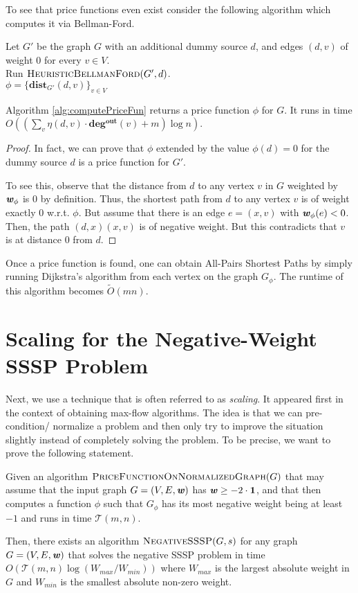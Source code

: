 To see that price functions even exist consider the following algorithm which computes it via Bellman-Ford.

\begin{algorithm}
Let $G'$ be the graph $G$ with an additional dummy source $d$, and edges $(d,v)$ of weight $0$ for every $v \in V$. \\
Run $\textsc{HeuristicBellmanFord}(G',d)$.\\
\Return $\phi =\{ \mathbf{dist}_{G'}(d,v)\}_{v \in V}$
\caption{$\textsc{ComputePriceFunction}(G)$}
\label{alg:computePriceFun}
\end{algorithm}

\begin{claim}
Algorithm \ref{alg:computePriceFun} returns a price function $\phi$ for $G$.  It runs in time $O((\sum_v \eta(d,v) \cdot \mathbf{deg^{out}}(v) + m) \log n)$. 
\end{claim}
\begin{proof}
In fact, we can prove that $\phi$ extended by the value $\phi(d) = 0$ for the dummy source $d$ is a price function for $G'$. 

To see this, observe that the distance from $d$ to any vertex $v$ in $G$ weighted by $\boldsymbol{\mathit{w}}_{\phi}$ is $0$ by definition. Thus, the shortest path from $d$ to any vertex $v$ is of weight exactly $0$ w.r.t. $\phi$. But assume that there is an edge $e = (x, v)$ with $\boldsymbol{\mathit{w}}_{\phi}(e) < 0$. Then, the path $(d,x)(x,v)$ is of negative weight. But this contradicts that $v$ is at distance $0$ from $d$.
\end{proof}

Once a price function is found, one can obtain All-Pairs Shortest Paths by simply running Dijkstra's algorithm from each vertex on the graph $G_{\phi}$.  The runtime of this algorithm becomes $\tilde{O}(mn)$. 

\section{Scaling for the Negative-Weight SSSP Problem}

Next, we use a technique that is often referred to as \emph{scaling}. It appeared first in the context of obtaining max-flow algorithms. The idea is that we can pre-condition/ normalize a problem and then only try to improve the situation slightly instead of completely solving the problem. To be precise, we want to prove the following statement.

\begin{theorem}\label{thm:reduceToNormalized}
Given an algorithm $\textsc{PriceFunctionOnNormalizedGraph}(G)$ that may assume that the input graph $G=(V,E,\boldsymbol{\mathit{w}})$ has $\boldsymbol{\mathit{w}} \geq -2 \cdot \boldsymbol{1}$, and that then computes a function $\phi$ such that $G_{\phi}$ has its most negative weight being at least $-1$ and runs in time $\mathcal{T}(m, n)$. 

Then, there exists an algorithm $\textsc{NegativeSSSP}(G,s)$ for any graph $G=(V,E, \boldsymbol{\mathit{w}})$ that solves the negative SSSP problem in time $O(\mathcal{T}(m, n) \log(W_{max}/W_{min}))$ where $W_{max}$ is the largest absolute weight in $G$ and $W_{min}$ is the smallest absolute non-zero weight.
\end{theorem}

